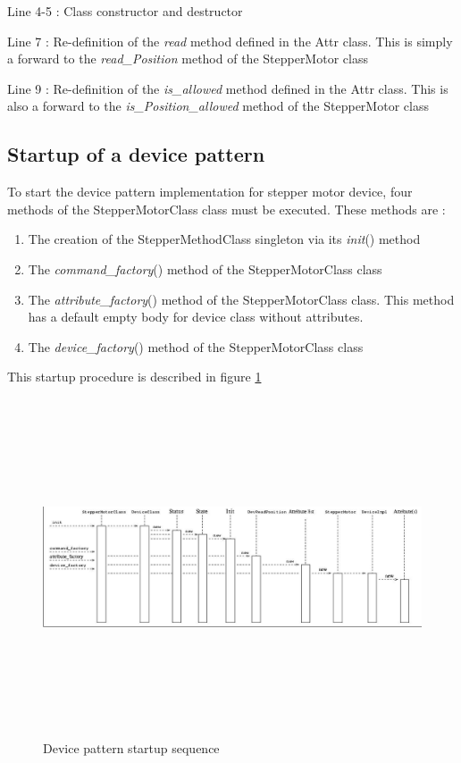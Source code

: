 Line 4-5 : Class constructor and destructor

Line 7 : Re-definition of the \emph{read} method defined in the Attr
class. This is simply a \textquotedbl{}forward\textquotedbl{} to the
\emph{read\_Position} method of the StepperMotor class

Line 9 : Re-definition of the \emph{is\_allowed} method defined in
the Attr class. This is also a \textquotedbl{}forward\textquotedbl{}
to the \emph{is\_Position\_allowed} method of the StepperMotor class

\subsection{Startup of a device pattern\label{Pattern startup}}

To start the device pattern implementation for stepper motor device,
four methods of the StepperMotorClass class must be executed. These
methods are :
\begin{enumerate}
\item The creation of the StepperMethodClass singleton
via its \emph{init}() method
\item The \emph{command\_factory}() method of the
StepperMotorClass class
\item The \emph{attribute\_factory}() method of
the StepperMotorClass class. This method has a default empty body
for device class without attributes.
\item The \emph{device\_factory}() method of the
StepperMotorClass class
\end{enumerate}
This startup procedure is described in figure \ref{pattern_startup_fig}
\begin{figure}
\begin{centering}
\includegraphics[width=14cm,height=10cm]{ds_writing/startup}
\par\end{centering}
\caption{Device pattern startup sequence\label{pattern_startup_fig}}
\end{figure}

